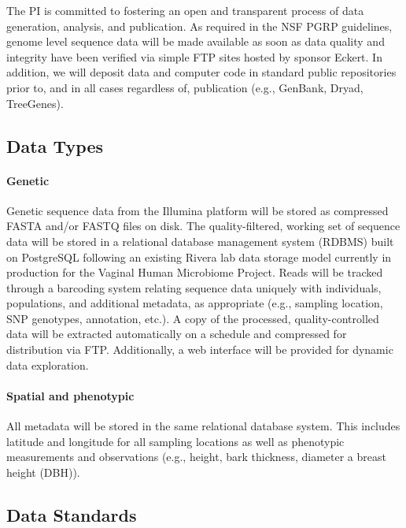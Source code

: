 \newpage


The PI is committed to fostering an open and transparent process of data generation, 
analysis, and publication. As required in the NSF PGRP guidelines, genome level sequence data will be made 
available as soon as data quality and integrity have been verified via simple FTP sites hosted by sponsor Eckert. 
In addition, we will deposit data and computer code in standard public repositories prior to, and in all cases 
regardless of, publication (e.g., GenBank, Dryad, TreeGenes).

\subsection*{Data Types}

\paragraph{Genetic}
Genetic sequence data from the Illumina platform will be stored as compressed FASTA and/or FASTQ files 
on disk. The quality-filtered, working set of sequence data will be stored in a relational database management system 
(RDBMS) built on PostgreSQL following an existing Rivera lab data storage model currently in production 
for the Vaginal Human Microbiome Project. Reads will be tracked through a barcoding system relating 
sequence data uniquely with individuals, populations, and additional metadata, as appropriate (e.g., sampling 
location, SNP genotypes, annotation, etc.).  A copy of the processed, quality-controlled data will be extracted 
automatically on a schedule and compressed for distribution via FTP.  Additionally, a web interface will be provided for 
dynamic data exploration.

\paragraph{Spatial and phenotypic}
All metadata will be stored in the same relational database system.  This includes latitude and longitude for all sampling
locations as well as phenotypic measurements and observations (e.g., height, bark thickness, diameter a breast height (DBH)).

\subsection*{Data Standards}

